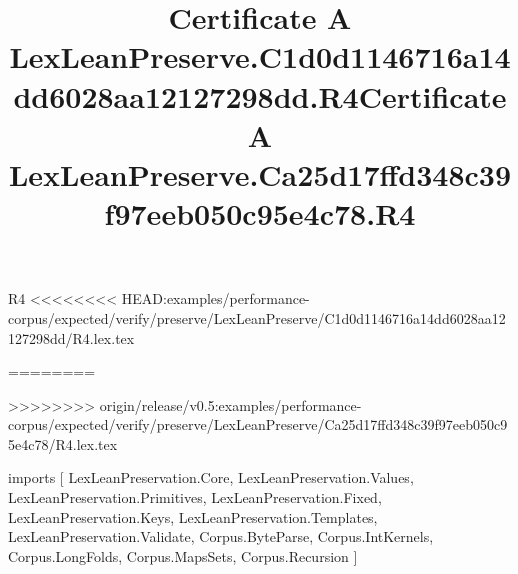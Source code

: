\begin{lexlean}{R4}
<<<<<<<< HEAD:examples/performance-corpus/expected/verify/preserve/LexLeanPreserve/C1d0d1146716a14dd6028aa12127298dd/R4.lex.tex
\title{Certificate A LexLeanPreserve.C1d0d1146716a14dd6028aa12127298dd.R4}
========
\title{Certificate A LexLeanPreserve.Ca25d17ffd348c39f97eeb050c95e4c78.R4}
>>>>>>>> origin/release/v0.5:examples/performance-corpus/expected/verify/preserve/LexLeanPreserve/Ca25d17ffd348c39f97eeb050c95e4c78/R4.lex.tex
\begin{coremodule}
imports [
  LexLeanPreservation.Core,
  LexLeanPreservation.Values,
  LexLeanPreservation.Primitives,
  LexLeanPreservation.Fixed,
  LexLeanPreservation.Keys,
  LexLeanPreservation.Templates,
  LexLeanPreservation.Validate,
  Corpus.ByteParse,
  Corpus.IntKernels,
  Corpus.LongFolds,
  Corpus.MapsSets,
  Corpus.Recursion
]


\end{coremodule}
\end{lexlean}
